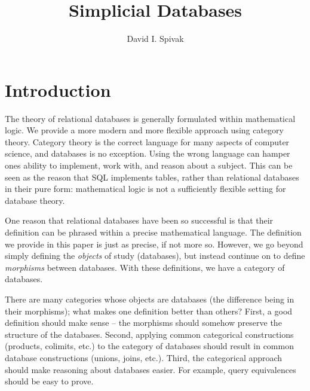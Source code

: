 \documentclass{amsart}
\begin{document}
\author{David I. Spivak}

\title{Simplicial Databases}

\maketitle

\begin{abstract}


\end{abstract}

\tableofcontents



\section{Introduction}


The theory of relational databases is generally formulated within mathematical logic.  We provide a more modern and more flexible approach using category theory.  Category theory is the correct language for many aspects of computer science, and databases is no exception.  Using the wrong language can hamper ones ability to implement, work with, and reason about a subject.  This can be seen as the reason that SQL implements tables, rather than relational databases in their pure form: mathematical logic is not a sufficiently flexible setting for database theory.

One reason that relational databases have been so successful is that their definition can be phrased within a precise mathematical language.  The definition we provide in this paper is just as precise, if not more so.  However, we go beyond simply defining the {\em objects} of study (databases), but instead continue on to define {\em morphisms} between databases.  With these definitions, we have a category of databases.

There are many categories whose objects are databases (the difference being in their morphisms); what makes one definition better than others?  First, a good definition should make sense -- the morphisms should somehow preserve the structure of the databases.  Second, applying common categorical constructions (products, colimits, etc.) to the category of databases should result in common database constructions (unions, joins, etc.).  Third, the categorical approach should make reasoning about databases easier.  For example, query equivalences should be easy to prove.
\end{document}
